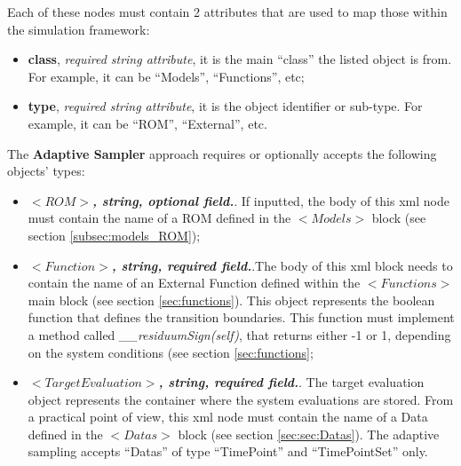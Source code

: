 \begin{itemize}
Each of these nodes  must contain 2 attributes that are used to map those within the simulation framework:
   \begin{itemize}
     \item \textbf{class}, \textit{required string attribute}, it is the main ``class'' the listed object is from. For example, it can be ``Models'', ``Functions'', etc;
     \item \textbf{type},  \textit{required string attribute}, it is the object identifier or sub-type. For example, it can be ``ROM'', ``External'', etc.
    \end{itemize}
The \textbf{Adaptive Sampler} approach requires or optionally accepts the following objects' types:
   \begin{itemize}
     \item $<ROM>$\textbf{\textit{, string, optional  field.}}. If inputted, the body of this xml node must contain the name of a ROM defined in the $<Models>$ block (see section \ref{subsec:models_ROM});
       \item $<Function>$\textbf{\textit{, string, required field.}}.The body of this xml block needs to contain the name of an External Function defined within the $<Functions>$ main block (see section \ref{sec:functions}). This object represents the boolean function that defines the transition boundaries. This function must implement a method called \textit{\_\_residuumSign(self)}, that returns either -1 or 1, depending on the system conditions (see section \ref{sec:functions};
        \item $<TargetEvaluation>$\textbf{\textit{, string, required field.}}. The target evaluation object represents the container where the system evaluations are stored. From a practical point of view, this xml node must contain the name of a Data defined in the $<Datas>$ block (see section \ref{sec:sec:Datas}). The adaptive sampling accepts ``Datas'' of type ``TimePoint''  and ``TimePointSet'' only.
    \end{itemize}
    
\end{itemize}



